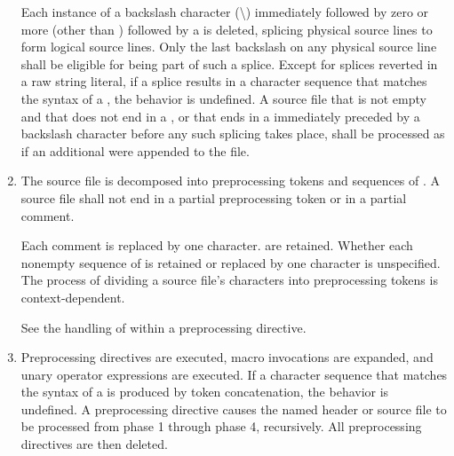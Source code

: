 \documentclass{wg21}
\begin{document}
\begin{enumerate}
Each instance of a backslash character (\textbackslash)
immediately followed by zero or more  (other than ) followed by a  is deleted, splicing
physical source lines to form logical source lines. Only the last
backslash on any physical source line shall be eligible for being part
of such a splice.
Except for splices reverted in a raw string literal, if a splice results in
a character sequence that matches the
syntax of a , the behavior is
undefined. A source file that is not empty and that does not end in a , or that ends in a  immediately preceded by a
backslash character before any such splicing takes place,
shall be processed as if an additional  were appended
to the file.

\item The source file is decomposed into preprocessing
tokens and sequences of . A source file shall not end in a partial
preprocessing token or in a partial comment.

Each comment is replaced by one  character.  are
retained. Whether each nonempty sequence of  is retained or replaced by one   character is
unspecified. The process of dividing a source file's
characters into preprocessing tokens is context-dependent.
\begin{example}
    See the handling of \tcode{<} within a  preprocessing
    directive.
\end{example}

\item Preprocessing directives are executed, macro invocations are
expanded, and  unary operator expressions are executed.
If a character sequence that matches the syntax of a
 is produced by token
concatenation, the behavior is undefined. A
 preprocessing directive causes the named header or
source file to be processed from phase 1 through phase 4, recursively.
All preprocessing directives are then deleted.


\end{enumerate}
\end{document}
